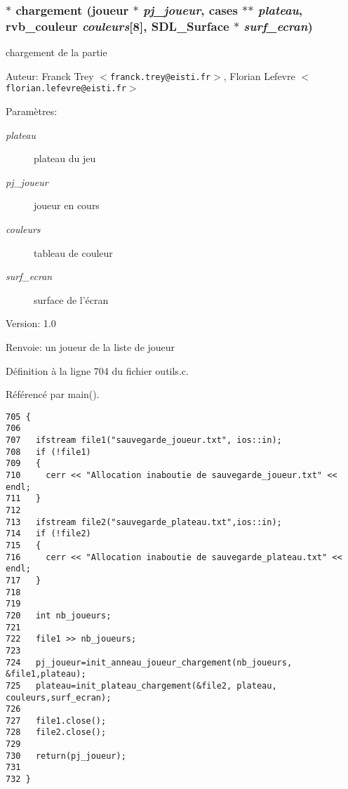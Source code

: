 \subsubsection{$\ast$ chargement ({\bf joueur} $\ast$ {\em pj\_\-joueur}, {\bf cases} $\ast$$\ast$ {\em plateau}, {\bf rvb\_\-couleur} {\em couleurs}[8], SDL\_\-Surface $\ast$ {\em surf\_\-ecran})}\label{outils_8h_84d7e81745982f84055adbd586bc248e}


chargement de la partie 

\begin{Desc}
\item[Auteur:]Franck Trey $<${\tt franck.trey@eisti.fr}$>$, Florian Lefevre $<${\tt florian.lefevre@eisti.fr}$>$\end{Desc}
\begin{Desc}
\item[Param\`{e}tres:]
\begin{description}
\item[{\em plateau}]plateau du jeu \item[{\em pj\_\-joueur}]joueur en cours \item[{\em couleurs}]tableau de couleur \item[{\em surf\_\-ecran}]surface de l'\'{e}cran\end{description}
\end{Desc}
\begin{Desc}
\item[Version:]1.0 \end{Desc}
\begin{Desc}
\item[Renvoie:]un joueur de la liste de joueur \end{Desc}


D\'{e}finition \`{a} la ligne 704 du fichier outils.c.

R\'{e}f\'{e}renc\'{e} par main().

\begin{Code}\begin{verbatim}705 {
706   
707   ifstream file1("sauvegarde_joueur.txt", ios::in);
708   if (!file1)
709   {
710     cerr << "Allocation inaboutie de sauvegarde_joueur.txt" << endl;
711   }
712   
713   ifstream file2("sauvegarde_plateau.txt",ios::in);
714   if (!file2)
715   {
716     cerr << "Allocation inaboutie de sauvegarde_plateau.txt" << endl;
717   }
718   
719   
720   int nb_joueurs;
721   
722   file1 >> nb_joueurs;
723   
724   pj_joueur=init_anneau_joueur_chargement(nb_joueurs, &file1,plateau);
725   plateau=init_plateau_chargement(&file2, plateau, couleurs,surf_ecran);
726   
727   file1.close();
728   file2.close();
729   
730   return(pj_joueur);
731 
732 }
\end{verbatim}\end{Code}


